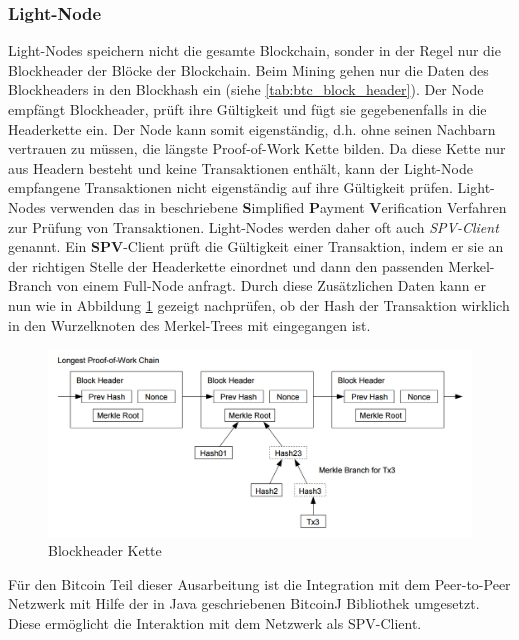 \subsubsection{Light-Node}
Light-Nodes speichern nicht die gesamte Blockchain, sonder in der Regel nur die Blockheader der Blöcke der Blockchain. Beim Mining gehen nur die Daten des Blockheaders in den Blockhash ein (siehe \ref{tab:btc_block_header}). Der Node empfängt Blockheader, prüft ihre Gültigkeit und fügt sie gegebenenfalls in die Headerkette ein. Der Node kann somit eigenständig, d.h. ohne seinen Nachbarn vertrauen zu müssen, die längste Proof-of-Work Kette bilden. Da diese Kette nur aus Headern besteht und keine Transaktionen enthält, kann der Light-Node empfangene Transaktionen nicht eigenständig auf ihre Gültigkeit prüfen. Light-Nodes verwenden das in \cite{bitcoin_white_paper} beschriebene \textbf{S}implified \textbf{P}ayment \textbf{V}erification Verfahren zur Prüfung von Transaktionen. Light-Nodes werden daher oft auch \textit{SPV-Client} genannt. Ein \textbf{SPV}-Client prüft die Gültigkeit einer Transaktion, indem er sie an der richtigen Stelle der Headerkette einordnet und dann den passenden Merkel-Branch von einem Full-Node anfragt. Durch diese Zusätzlichen Daten kann er nun wie in Abbildung \ref{fig:spv_chain} gezeigt nachprüfen, ob der Hash der Transaktion wirklich in den Wurzelknoten des Merkel-Trees mit eingegangen ist.

\begin{figure}[H]
\centering
\includegraphics[width=1\linewidth]{Figures/umsetzung_btc/spv_chain}
\decoRule
\caption{Blockheader Kette \cite{ethereum_white_paper}}
\label{fig:spv_chain}
\end{figure}

Für den Bitcoin Teil dieser Ausarbeitung ist die Integration mit dem Peer-to-Peer Netzwerk mit Hilfe der in Java geschriebenen BitcoinJ \cite{bitcoinj} Bibliothek umgesetzt. Diese ermöglicht die Interaktion mit dem Netzwerk als SPV-Client.

